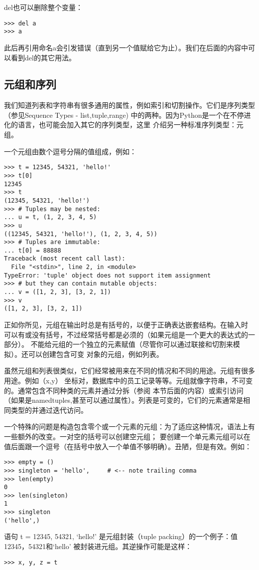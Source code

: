 \documentclass[UTF8]{ctexart}
\begin{document}
del也可以删除整个变量：
\begin{verbatim}
>>> del a
>>> a
\end{verbatim}

此后再引用命名a会引发错误（直到另一个值赋给它为止）。我们在后面的内容中可以看到del的其它用法。
\subsection{元组和序列}
我们知道列表和字符串有很多通用的属性，例如索引和切割操作。它们是序列类型（参见Sequence Types -
list,tuple,range) 中的两种。因为Python是一个在不停进化的语言，也可能会加入其它的序列类型，这里
介绍另一种标准序列类型：元组。

一个元组由数个逗号分隔的值组成，例如：
\begin{verbatim}
>>> t = 12345, 54321, 'hello!'
>>> t[0]
12345
>>> t
(12345, 54321, 'hello!')
>>> # Tuples may be nested:
... u = t, (1, 2, 3, 4, 5)
>>> u
((12345, 54321, 'hello!'), (1, 2, 3, 4, 5))
>>> # Tuples are immutable:
... t[0] = 88888
Traceback (most recent call last):
  File "<stdin>", line 2, in <module>
TypeError: 'tuple' object does not support item assignment
>>> # but they can contain mutable objects:
... v = ([1, 2, 3], [3, 2, 1])
>>> v
([1, 2, 3], [3, 2, 1])
\end{verbatim}
正如你所见，元组在输出时总是有括号的，以便于正确表达嵌套结构。在输入时
可以有或没有括号，不过经常括号都是必须的（如果元组是一个更大的表达式的一部分）。
不能给元组的一个独立的元素赋值（尽管你可以通过联接和切割来模拟）。还可以创建包含可变
对象的元组，例如列表。

虽然元组和列表很类似，它们经常被用来在不同的情况和不同的用途。元组有很多用途。例如（x,y）
坐标对，数据库中的员工记录等等。元组就像字符串，不可变的。通常包含不同种类的元素并通过分拆（参阅
本节后面的内容）或索引访问（如果是namedtuples,甚至可以通过属性）。列表是可变的，它们的元素通常是相同类型的并通过迭代访问。

一个特殊的问题是构造包含零个或一个元素的元组：为了适应这种情况，语法上有一些额外的改变。一对空的括号可以创建空元组；
要创建一个单元素元组可以在值后面跟一个逗号（在括号中放入一个单值不够明确）。丑陋，但是有效。例如：
\begin{verbatim}
>>> empty = ()
>>> singleton = 'hello',     # <-- note trailing comma
>>> len(empty)
0
>>> len(singleton)
1
>>> singleton
('hello',)
\end{verbatim}

语句 t = 12345, 54321, `hello!' 是元组封装（tuple packing）的一个例子：值12345，54321和`hello'
被封装进元组。其逆操作可能是这样：
\begin{verbatim}
>>> x, y, z = t
\end{verbatim}
\end{document}
